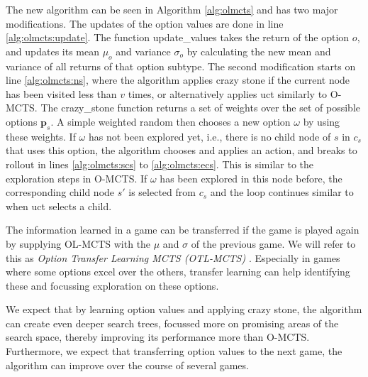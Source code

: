 The new algorithm can be seen in Algorithm \ref{alg:olmcts} and has two major
modifications. The updates of the option values are done in line
\ref{alg:olmcts:update}. The function \textsf{update\_values} takes the return
of the option $o$, and updates its mean $\mu_o$ and variance $\sigma_o$ by
calculating the new mean and variance of all returns of that option subtype. The
second modification starts on line \ref{alg:olmcts:ns}, where the algorithm
applies crazy stone if the current node has been visited less than $v$ times, or
alternatively applies \textsf{uct} similarly to O-MCTS. The
\textsf{crazy\_stone} function returns a set of weights over the set of possible
options $\mathbf{p}_s$. A simple weighted random then chooses a new option
$\omega$ by using these weights.  If $\omega$ has not been explored yet, i.e.,
there is no child node of $s$ in $c_s$ that uses this option, the algorithm
chooses and applies an action, and breaks to rollout in lines
\ref{alg:olmcts:scs} to \ref{alg:olmcts:ecs}. This is similar to the exploration
steps in O-MCTS. If $\omega$ has been explored in this node before, the
corresponding child node $s'$ is selected from $c_s$ and the loop continues
similar to when \textsf{uct} selects a child.

The information learned in a game can be transferred if the game is played
again by supplying OL-MCTS with the $\mu$ and $\sigma$ of the previous game. We
will refer to this as \emph{Option Transfer Learning MCTS (OTL-MCTS)} . Especially
in games where some options excel over the others, transfer learning can help
identifying these and focussing exploration on these options. 

We expect that by learning option values and applying crazy stone, the algorithm
can create even deeper search trees, focussed more on promising areas of the
search space, thereby improving its performance more than O-MCTS. Furthermore,
we expect that transferring option values to the next game, the algorithm can
improve over the course of several games.
